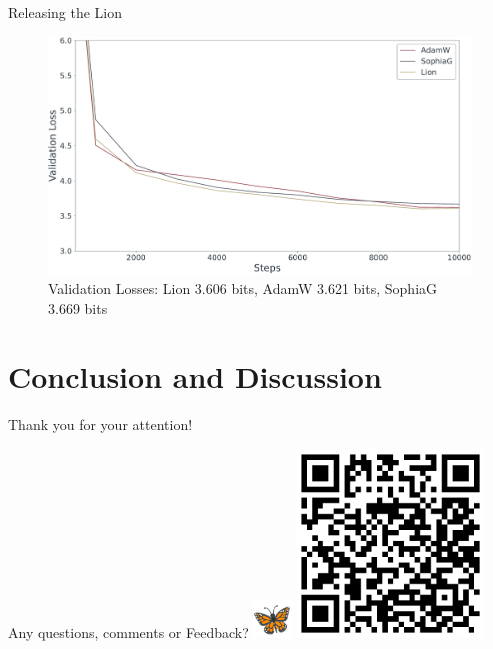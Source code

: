 \documentclass[
	11pt, %
	aspectratio=169, %
]{beamer}
\begin{document}
\begin{frame}{Releasing the Lion}
 \begin{figure}
	\includegraphics[width=12cm]{../results/lion_adam_sophia.pdf}
	\caption*{Validation Losses: Lion 3.606 bits, AdamW 3.621 bits, SophiaG 3.669 bits}
 \end{figure}
\end{frame}



\section{Conclusion and Discussion}
\begin{frame}[plain] %
	\begin{center}
		{\Huge Thank you for your attention! }
		
		\bigskip\bigskip %
		
		{\LARGE Any questions, comments or Feedback? \includegraphics[width=1cm]{figures/vae.png}}
		\includegraphics[width=5cm]{qr_to_wandb.png}
	\end{center}
\end{frame}
\end{document}

